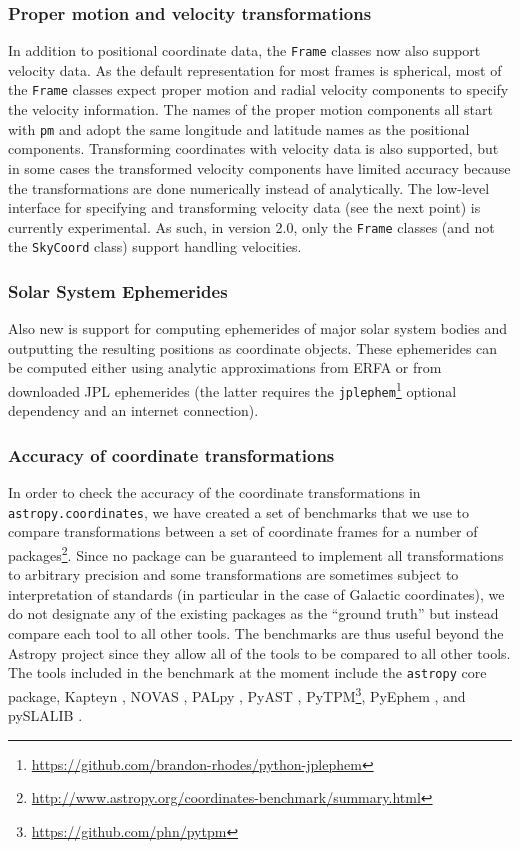 \documentclass[modern]{aastex61}
\newcommand{\package}[1]{\texttt{#1}\xspace}
\newcommand{\astropy}{Astropy\xspace}
\newcommand{\astropypkg}{\package{astropy}}
\begin{document}
\subsubsection{Proper motion and velocity transformations}
    In addition to positional coordinate data, the \texttt{Frame} classes now
    also support velocity data.
    As the default representation for most frames is spherical, most of the
    \texttt{Frame} classes expect proper motion and radial velocity components
    to specify the velocity information.
    The names of the proper motion components all start with \texttt{pm} and
    adopt the same longitude and latitude names as the positional components.
    Transforming coordinates with velocity data is also supported, but in some
    cases the transformed velocity components have limited accuracy because the
    transformations are done numerically instead of analytically.
    The low-level interface for specifying and transforming velocity data (see
    the next point) is currently experimental.
    As such, in version 2.0, only the \texttt{Frame} classes (and not the
    \texttt{SkyCoord} class) support handling velocities.

\subsubsection{Solar System Ephemerides}
    Also new is support for computing ephemerides of major solar system bodies
    and outputting the resulting positions as coordinate objects.
    These ephemerides can be computed either using analytic approximations from
    ERFA or from downloaded JPL ephemerides (the latter requires the
    \package{jplephem}\footnote{\url{https://github.com/brandon-rhodes/python-jplephem}}
    optional dependency and an internet connection).

\subsubsection{Accuracy of coordinate transformations}

In order to check the accuracy of the coordinate transformations in
\package{astropy.coordinates}, we have created a set of benchmarks that we use
to compare transformations between a set of coordinate frames for a number of
packages\footnote{\url{http://www.astropy.org/coordinates-benchmark/summary.html}}.
Since no package can be guaranteed to implement all transformations to
arbitrary precision and some transformations are sometimes subject to
interpretation of standards (in particular in the case of Galactic coordinates),
we do not designate any of the existing packages as the ``ground truth'' but
instead compare each tool to all other tools. The benchmarks are thus useful
beyond the \astropy project since they allow all of the tools to be compared to
all other tools. The tools included in the benchmark at the moment include the
\astropypkg core package, Kapteyn \citep{kapteyn}, NOVAS \citep{novas},
PALpy \citep{pal}, PyAST \citep[a wrapper for AST, described in][]{ast},
PyTPM\footnote{\url{https://github.com/phn/pytpm}}, PyEphem \citep{pyephem},
and pySLALIB \citep[a Python wrapper for SLALIB, described in][]{slalib}.
\end{document}
